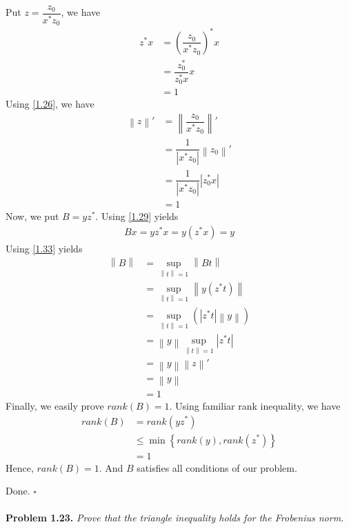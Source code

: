 \documentclass[a4paper,oneside]{book}
\numberwithin{equation}{chapter}
\begin{document}
\begin{enumerate}
Put $z = \dfrac{{{z_0}}}{{{x^*}{z_0}}}$, we have
\begin{align}
{z^*}x &= {\left( {\dfrac{{{z_0}}}{{{x^*}{z_0}}}} \right)^*}x\\
& = \dfrac{{z_0^*}}{{z_0^*x}}x\\
& = 1\label{1.29}
\end{align}
Using \eqref{1.26}, we have
\begin{align}
\left\| z \right\|'& = \left\| {\dfrac{{{z_0}}}{{{x^*}{z_0}}}} \right\|'\\
& = \dfrac{1}{{\left| {{x^*}{z_0}} \right|}}\left\| {{z_0}} \right\|'\\
& = \dfrac{1}{{\left| {{x^*}{z_0}} \right|}}\left| {z_0^*x} \right|\\
& = 1 \label{1.33}
\end{align}
Now, we put $B=yz^*$. Using \eqref{1.29} yields
\begin{align}
Bx = y{z^*}x = y\left( {{z^*}x} \right) = y
\end{align}
Using \eqref{1.33} yields
\begin{align}
\left\| B \right\| &= \mathop {\sup }\limits_{\left\| t \right\| = 1} \left\| {Bt} \right\|\\
& = \mathop {\sup }\limits_{\left\| t \right\| = 1} \left\| {y\left( {{z^*}t} \right)} \right\|\\
& = \mathop {\sup }\limits_{\left\| t \right\| = 1} \left( {\left| {{z^*}t} \right|\left\| y \right\|} \right)\\
& = \left\| y \right\|\mathop {\sup }\limits_{\left\| t \right\| = 1} \left| {{z^*}t} \right|\\
& = \left\| y \right\|\left\| z \right\|'\\
& = \left\| y \right\|\\
& = 1
\end{align}
Finally, we easily prove $rank\left(B\right)=1$. Using familiar rank inequality, we have
\begin{align}
rank\left( B \right) &= rank\left( {y{z^*}} \right)\\
& \le \min \left\{ {rank\left( y \right),rank\left( {{z^*}} \right)} \right\}\\
& = 1
\end{align}
Hence, $rank\left(B\right)=1$. And $B$ satisfies all conditions of our problem. 
\end{enumerate}
Done. \hfill $\square$\\
\\
\textbf{Problem 1.23.} \textit{Prove that the triangle inequality holds for the Frobenius norm.}\\
\end{document}
